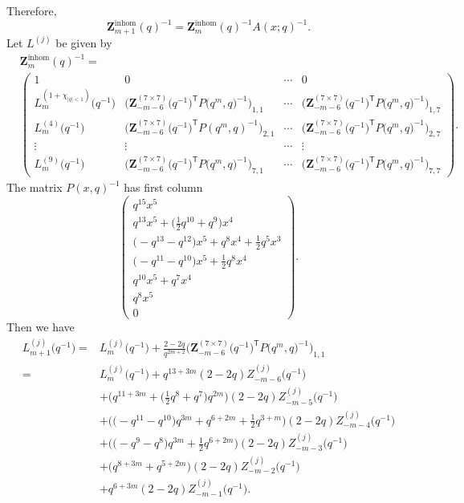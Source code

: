 \documentclass[pdftex]{sigma}
\numberwithin{equation}{section}
\begin{document}
Therefore,
\[
 \mathbf{Z}^{\mathrm{inhom}}_{m+1}(q)^{-1}
  =
 \mathbf{Z}^{\mathrm{inhom}}_{m}(q)^{-1}A(x;q)^{-1} .
\]
Let $L^{(j)}$ be given by
\begin{align*}
 &\mathbf{Z}^{\mathrm{inhom}}_{m}(q)^{-1} =\\
 &
 \begin{pmatrix}
 1 & 0 & \cdots & 0\\
 L^{(1+\chi_{|q|<1})}_{m}\bigl(q^{-1}\bigr) & \bigl(\mathbf{Z}_{-m-6}^{(7\times 7)}\bigl(q^{-1}\bigr)^{\mathsf{T}}P\bigl(q^{m},q\bigr)^{-1}\bigr)_{1,1} & \cdots & \bigl(\mathbf{Z}_{-m-6}^{(7\times 7)}\bigl(q^{-1}\bigr)^{\mathsf{T}}P\bigl(q^{m},q\bigr)^{-1}\bigr)_{1,7}\\[1mm]
 L^{(4)}_{m}\bigl(q^{-1}\bigr) & \bigl(\mathbf{Z}_{-m-6}^{(7\times 7)}\bigl(q^{-1}\bigr)^{\mathsf{T}}P(q^{m},q)^{-1}\bigr)_{2,1} & \cdots & \bigl(\mathbf{Z}_{-m-6}^{(7\times 7)}\bigl(q^{-1}\bigr)^{\mathsf{T}}P\bigl(q^{m},q\bigr)^{-1}\bigr)_{2,7}\\
 \vdots & \vdots & \cdots & \vdots\\
 L^{(9)}_{m}\bigl(q^{-1}\bigr) & \bigl(\mathbf{Z}_{-m-6}^{(7\times 7)}\bigl(q^{-1}\bigr)^{\mathsf{T}}P\bigl(q^{m},q\bigr)^{-1}\bigr)_{7,1} & \cdots & \bigl(\mathbf{Z}_{-m-6}^{(7\times 7)}\bigl(q^{-1}\bigr)^{\mathsf{T}}P\bigl(q^{m},q\bigr)^{-1}\bigr)_{7,7}
 \end{pmatrix} \!.
\end{align*}
The matrix $P(x,q)^{-1}$ has first column
\[
 \begin{pmatrix}
 q^{15}x^5\\[1mm]
 q^{13}x^5 + \bigl(\frac{1}{2}q^{10} + q^9\bigr)x^4\\[1mm]
 \bigl(-q^{13} - q^{12}\bigr)x^5 + q^8x^4 + \frac{1}{2}q^5x^3\\[1mm]
 \bigl(-q^{11} - q^{10}\bigr)x^5 + \frac{1}{2}q^8x^4\\[1mm]
 q^{10}x^5 + q^7x^4\\[1mm]
 q^8x^5\\
 0
 \end{pmatrix}.
\]
Then we have
\begin{align*}
 L^{(j)}_{m+1}\bigl(q^{-1}\bigr)
 ={}&
 L^{(j)}_{m}\bigl(q^{-1}\bigr)
 +\frac{2-2q}{q^{2m+2}}\bigl(\mathbf{Z}_{-m-6}^{(7\times 7)}\bigl(q^{-1}\bigr)^{\mathsf{T}}P\bigl(q^{m},q\bigr)^{-1}\bigr)_{1,1}\\
= {} &
 L^{(j)}_{m}\bigl(q^{-1}\bigr)
 +
 q^{13+3m}(2-2q)Z_{-m-6}^{(j)}\bigl(q^{-1}\bigr)\\
&
 +\biggl(q^{11+3m} + \biggl(\frac{1}{2}q^{8} + q^7\biggr)q^{2m}\biggr)(2-2q)Z_{-m-5}^{(j)}\bigl(q^{-1}\bigr)\\
 & +\biggl(\bigl(-q^{11} - q^{10}\bigr)q^{3m} + q^{6+2m} + \frac{1}{2}q^{3+m}\biggr)(2-2q)Z_{-m-4}^{(j)}\bigl(q^{-1}\bigr)\\
 & +\biggl(\bigl(-q^{9} - q^{8}\bigr)q^{3m} + \frac{1}{2}q^{6+2m}\biggr)(2-2q)Z_{-m-3}^{(j)}\bigl(q^{-1}\bigr)\\
 & +\bigl(q^{8+3m} + q^{5+2m}\bigr)(2-2q)Z_{-m-2}^{(j)}\bigl(q^{-1}\bigr)\\
 & +q^{6+3m}(2-2q)Z_{-m-1}^{(j)}\bigl(q^{-1}\bigr).
\end{align*}
\end{document}
